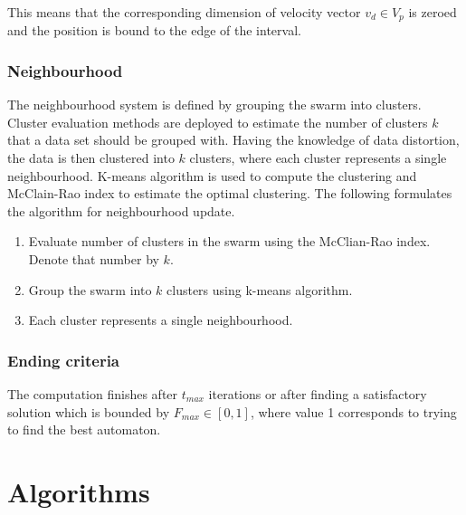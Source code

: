 \documentclass{article}
\begin{document}
This means that the corresponding dimension of velocity vector $v_d \in V_p$ is zeroed and the position is bound to the edge of the interval.

\subsubsection{Neighbourhood}
The neighbourhood system is defined by grouping the swarm into clusters. Cluster evaluation methods are deployed to estimate the number of clusters $k$ that a data set should be grouped with. Having the knowledge of data distortion, the data is then clustered into $k$ clusters, where each cluster represents a single neighbourhood. K-means algorithm is used to compute the clustering and McClain-Rao index to estimate the optimal clustering. The following formulates the algorithm for neighbourhood update.

\begin{enumerate}
	\item Evaluate number of clusters in the swarm using the McClian-Rao index. Denote that number by $k$.
	\item Group the swarm into $k$ clusters using k-means algorithm.
	\item Each cluster represents a single neighbourhood.
\end{enumerate}


\subsubsection{Ending criteria}
The computation finishes after $t_{max}$ iterations or after finding a satisfactory solution which is bounded by $F_{max} \in [0,1]$, where value 1 corresponds to trying to find the best automaton.



\section{Algorithms} \label{sec:algorithms}
\end{document}
